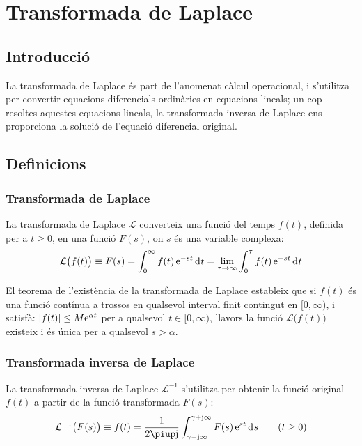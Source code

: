\chapter{Transformada de Laplace}\label{sec:laplace}

\section{Introducció}
La transformada de Laplace és part de l'anomenat càlcul operacional,
i s'utilitza per convertir equacions diferencials ordinàries en
equacions lineals; un cop resoltes aquestes equacions lineals, la
transformada inversa de Laplace ens proporciona la solució de
l'equació diferencial original.

\section{Definicions}

\subsection{Transformada de Laplace}

La transformada de Laplace $\mathcal{L}$  converteix una funció del
temps $f(t)$, definida per a $t\geq 0$, en una funció $F(s)$, on $s$
és una variable complexa:
\begin{equation}
    \mathcal{L}\bigl(f(t)\bigr) \equiv F(s) = \int_0^\infty f(t) \,\eu^{-s t} \diff t =
    \lim_{\tau\to\infty} \int_0^\tau f(t) \,\eu^{-s t} \diff t \label{eq:transf_laplace}
\end{equation}

El teorema de l'existència de la transformada de Laplace estableix
que si $f(t)$ és una funció contínua a trossos en qualsevol
interval finit contingut en $[0,\infty)$, i satisfà: $|f(t)| \leq M
\mathrm{e}^{\alpha t}$ per a qualsevol $t \in [0,\infty)$, llavors la
funció $\mathcal{L}\bigl(f(t)\bigr)$ existeix i és única per a
qualsevol $s > \alpha$.

\subsection{Transformada inversa de Laplace}

La transformada inversa de Laplace $\mathcal{L}^{-1}$ s'utilitza per
obtenir la funció original $f(t)$ a partir de la funció
transformada $F(s)$:
\begin{equation}
    \mathcal{L}^{-1}\bigl(F(s)\bigr) \equiv f(t) = \frac{1}{2 \piup \ju }
    \int_{\gamma-\ju \infty}^{\gamma+\ju \infty} F(s)\, \eu^{s t} \diff s
    \qquad (t\geq 0) \label{eq:transf_inv_laplace}
\end{equation}

